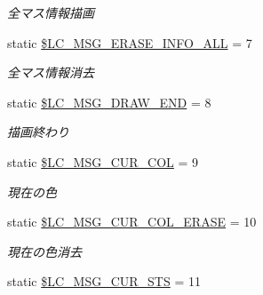 \begin{DoxyCompactItemize}
\begin{DoxyCompactList}\small\item\em 全マス情報描画 \end{DoxyCompactList}\item 
static \hyperlink{class_reversi_const_ad45d7e4a301c2cfa4b0a12ddfa373425}{\$\+L\+C\+\_\+\+M\+S\+G\+\_\+\+E\+R\+A\+S\+E\+\_\+\+I\+N\+F\+O\+\_\+\+A\+LL} = 7\hypertarget{class_reversi_const_ad45d7e4a301c2cfa4b0a12ddfa373425}{}\label{class_reversi_const_ad45d7e4a301c2cfa4b0a12ddfa373425}

\begin{DoxyCompactList}\small\item\em 全マス情報消去 \end{DoxyCompactList}\item 
static \hyperlink{class_reversi_const_ac5fc5dc1425fd1c238faf57d0d3d0510}{\$\+L\+C\+\_\+\+M\+S\+G\+\_\+\+D\+R\+A\+W\+\_\+\+E\+ND} = 8\hypertarget{class_reversi_const_ac5fc5dc1425fd1c238faf57d0d3d0510}{}\label{class_reversi_const_ac5fc5dc1425fd1c238faf57d0d3d0510}

\begin{DoxyCompactList}\small\item\em 描画終わり \end{DoxyCompactList}\item 
static \hyperlink{class_reversi_const_a6acbb83271876a127eadc9eb7cb425cd}{\$\+L\+C\+\_\+\+M\+S\+G\+\_\+\+C\+U\+R\+\_\+\+C\+OL} = 9\hypertarget{class_reversi_const_a6acbb83271876a127eadc9eb7cb425cd}{}\label{class_reversi_const_a6acbb83271876a127eadc9eb7cb425cd}

\begin{DoxyCompactList}\small\item\em 現在の色 \end{DoxyCompactList}\item 
static \hyperlink{class_reversi_const_aca271c05f15761f26583cfb884e5fc20}{\$\+L\+C\+\_\+\+M\+S\+G\+\_\+\+C\+U\+R\+\_\+\+C\+O\+L\+\_\+\+E\+R\+A\+SE} = 10\hypertarget{class_reversi_const_aca271c05f15761f26583cfb884e5fc20}{}\label{class_reversi_const_aca271c05f15761f26583cfb884e5fc20}

\begin{DoxyCompactList}\small\item\em 現在の色消去 \end{DoxyCompactList}\item 
static \hyperlink{class_reversi_const_ac3301c4726ee8acb3d5f2810d9e0559e}{\$\+L\+C\+\_\+\+M\+S\+G\+\_\+\+C\+U\+R\+\_\+\+S\+TS} = 11\hypertarget{class_reversi_const_ac3301c4726ee8acb3d5f2810d9e0559e}{}\label{class_reversi_const_ac3301c4726ee8acb3d5f2810d9e0559e}


\end{DoxyCompactItemize}
